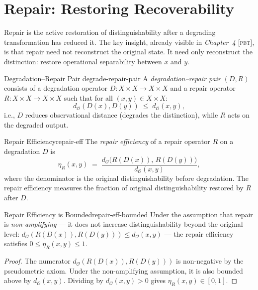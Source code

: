 \documentclass[12pt,twoside,openright]{book}
\newcommand{\distPairs}{X\times X}
\newcommand{\distMetric}{d_{\mathcal{O}}}
\newcommand{\PBT}[1]{\textit{#1} [\textsc{pbt}]}
\providecommand{\repairEff}[1]{\eta_{R}(#1)}
\providecommand{\degradeOp}{D}
\begin{document}
\section{Repair: Restoring Recoverability}

Repair is the active restoration of distinguishability after
a degrading transformation has reduced it. The key insight,
already visible in \PBT{Chapter~4}, is that repair need not
reconstruct the original state. It need only reconstruct the
distinction: restore operational separability between $x$ and
$y$.

\begin{definition}{Degradation--Repair Pair}%
  {degrade-repair-pair}
A \emph{degradation--repair pair} $(\degradeOp, R)$ consists
of a degradation operator $\degradeOp:\distPairs\to\distPairs$
and a repair operator $R:\distPairs\to\distPairs$ such that
for all $(x,y)\in\distPairs$:
\[
  \distMetric(\degradeOp(x),\degradeOp(y))
  \;\le\;
  \distMetric(x,y),
\]
i.e., $\degradeOp$ reduces observational distance (degrades
the distinction), while $R$ acts on the degraded output.
\end{definition}

\begin{definition}{Repair Efficiency}{repair-eff}
The \emph{repair efficiency} of a repair operator $R$ on
a degradation $\degradeOp$ is
\[
  \repairEff{x,y}
  \;=\;
  \frac{
    \distMetric\bigl(R(\degradeOp(x)),\,R(\degradeOp(y))\bigr)
  }{
    \distMetric(x,y)
  },
\]
where the denominator is the original distinguishability
before degradation. The repair efficiency measures the
fraction of original distinguishability restored by $R$
after $\degradeOp$.
\end{definition}

\begin{theorem}{Repair Efficiency is Bounded}{repair-eff-bounded}
Under the assumption that repair is \emph{non-amplifying}
--- it does not increase distinguishability beyond the original
level: $\distMetric(R(\degradeOp(x)),R(\degradeOp(y)))\le
\distMetric(x,y)$ --- the repair efficiency satisfies
$0\le\repairEff{x,y}\le 1$.
\begin{proof}
The numerator $\distMetric(R(\degradeOp(x)),R(\degradeOp(y)))$
is non-negative by the pseudometric axiom. Under the
non-amplifying assumption, it is also bounded above by
$\distMetric(x,y)$. Dividing by $\distMetric(x,y)>0$
gives $\repairEff{x,y}\in[0,1]$.
\end{proof}
\end{theorem}
\end{document}

